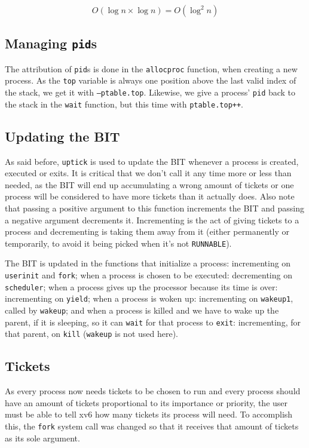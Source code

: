 \documentclass[12pt]{article}
\begin{document}
$$O(\log n \times \log n) = O(\log^2 n)$$

\subsection{Managing \texttt{pid}s}
The attribution of \texttt{pid}s is done in the \texttt{allocproc}
function, when creating a new process. As the \texttt{top} variable is
always one position above the last valid index of the stack, we
get it with \texttt{--ptable.top}. Likewise, we give a process' \texttt{pid} back
to the stack in the \texttt{wait} function, but this time with \texttt{ptable.top++}.

\subsection{Updating the BIT}
As said before, \texttt{uptick} is used to update the BIT whenever a
process is created, executed or exits. It is critical that we don't call
it any time more or less than needed, as the BIT will end up
accumulating a wrong amount of tickets or one process will be considered
to have more tickets than it actually does. Also note that passing a
positive argument to this function increments the BIT and passing a
negative argument decrements it. Incrementing is the act of giving
tickets to a process and decrementing is taking them away from it
(either permanently or temporarily, to avoid it being picked when it's
not \texttt{RUNNABLE}).

The BIT is updated in the functions that initialize a
process: incrementing on \texttt{userinit} and \texttt{fork}; when a
process is chosen to be executed: decrementing on \texttt{scheduler};
when a process gives up the processor because its time is over:
incrementing on \texttt{yield}; when a process is woken up: incrementing
on \texttt{wakeup1}, called by \texttt{wakeup}; and when a process is
killed and we have to wake up the parent, if it is sleeping, so it can
\texttt{wait} for that process to \texttt{exit}: incrementing, for that
parent, on \texttt{kill} (\texttt{wakeup} is not used here).

\subsection{Tickets}
As every process now needs tickets to be chosen to run and every process
should have an amount of tickets proportional to its importance or
priority, the user must be able to tell xv6 how many tickets its process
will need. To accomplish this, the \texttt{fork} system call was changed so that
it receives that amount of tickets as its sole argument.
\end{document}
